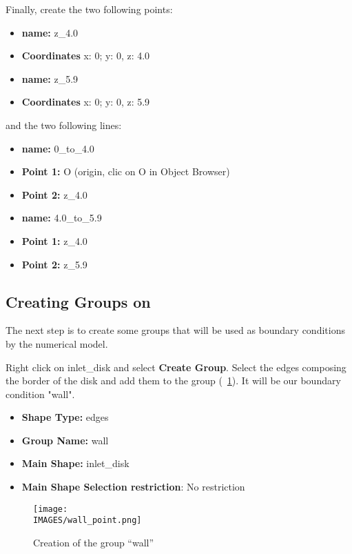 Finally, create the two following points:
\begin{itemize}
	\item \textbf{name:} z\_4.0
	\item  \textbf{Coordinates} x: 0; y: 0, z: 4.0
\end{itemize} 
%
\begin{itemize}
	\item \textbf{name:} z\_5.9
	\item  \textbf{Coordinates} x: 0; y: 0, z: 5.9
\end{itemize} 
%
and the two following lines:
\begin{itemize}
	\item \textbf{name:} 0\_to\_4.0
	\item \textbf{Point 1:} O (origin, clic on O in Object Browser)
	\item \textbf{Point 2:} z\_4.0
\end{itemize} 
%
\begin{itemize}
	\item \textbf{name:} 4.0\_to\_5.9
	\item \textbf{Point 1:} z\_4.0 
	\item \textbf{Point 2:} z\_5.9
\end{itemize} 
%
\subsection{Creating Groups on \geom}
%
The next step is
to create some groups that will be used as boundary conditions by the numerical model.

Right click on inlet\_disk and select \textbf{Create Group}.
Select the edges composing the border of the disk and add them to the group (\figurename~\ref{lag:wall_group}). It will be our boundary condition "wall".
%
\begin{itemize}
	\item \textbf{Shape Type:} edges
	\item \textbf{Group Name:} wall
	\item \textbf{Main Shape:} inlet\_disk
	\item \textbf{Main Shape Selection restriction}: No restriction
\end{itemize}
%
\begin{figure}[H]
	\centering
	\texttt{[image: \\IMAGES/wall\_point.png]}
	\caption{Creation of the group ``wall''}
	\label{lag:wall_group}
\end{figure}
%
\clearpage
%
